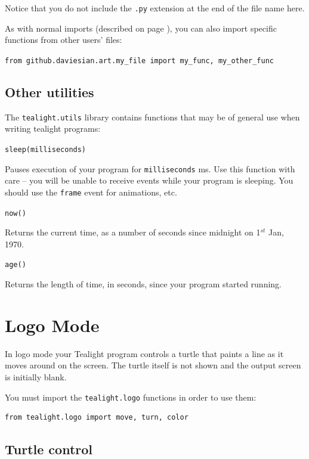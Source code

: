 \documentclass[12pt,a4paper,twoside]{article}
\renewcommand{\_}{\texttt{\symbol{95}}}
\begin{document}
Notice that you do not include the \verb^.py^ extension at the end of the file name here.

As with normal imports (described on page \pageref{subsec:libraries}), you can also import specific functions from other users' files:

\verb^from github.daviesian.art.my_file import my_func, my_other_func^

\subsection{Other utilities}

The \verb^tealight.utils^ library contains functions that may be of general use when writing tealight programs:

\begin{bulletlist}
\item \verb^sleep(milliseconds)^

	Pauses execution of your program for \verb^milliseconds^ ms. Use this function with care -- you will be unable to receive events while your program is sleeping. You should use the \verb^frame^ event for animations, etc.

\item \verb^now()^

	Returns the current time, as a number of seconds since midnight on 1$^{st}$ Jan, 1970.

\item \verb^age()^

	Returns the length of time, in seconds, since your program started running.
\end{bulletlist}


\newpage
\section{Logo Mode} \label{sec:logo-mode}

In logo mode your Tealight program controls a turtle that paints
a line as it moves around on the screen. The turtle itself is
not shown and the output screen is initially blank.

You must import the \verb^tealight.logo^ functions in order to use them:

\begin{verbatim}
from tealight.logo import move, turn, color
\end{verbatim}

\subsection{Turtle control}
\end{document}
